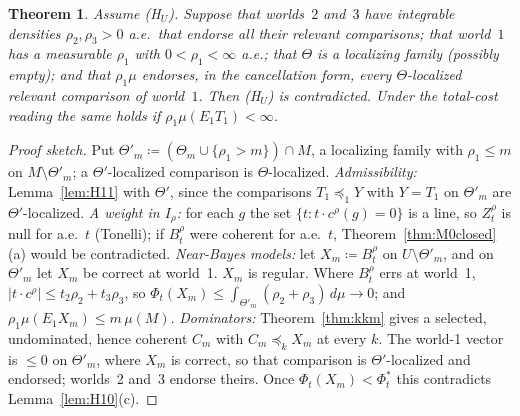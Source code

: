 \documentclass[11pt]{article}
\newtheorem{theorem}{Theorem}[section]
\theoremstyle{definition}
\theoremstyle{remark}
\begin{document}
\begin{theorem}\label{thm:H12}
Assume (H$_U$). Suppose that worlds~$2$ and~$3$ have integrable densities $\rho_2,\rho_3>0$ a.e.\ that endorse all their relevant comparisons; that world~$1$ has a measurable $\rho_1$ with $0<\rho_1<\infty$ a.e.; that $\Theta$ is a localizing family (possibly empty); and that $\rho_1\mu$ endorses, in the cancellation form, every $\Theta$-localized relevant comparison of world~$1$. Then (H$_U$) is contradicted. Under the total-cost reading the same holds if $\rho_1\mu(E_1T_1)<\infty$.
\end{theorem}
\begin{proof}[Proof sketch]
Put $\Theta'_m\coloneqq(\Theta_m\cup\{\rho_1>m\})\cap M$, a localizing family with $\rho_1\le m$ on $M\setminus\Theta'_m$; a $\Theta'$-localized comparison is $\Theta$-localized. \emph{Admissibility:} Lemma~\ref{lem:H11} with $\Theta'$, since the comparisons $T_1\preceq_1Y$ with $Y=T_1$ on $\Theta'_m$ are $\Theta'$-localized. \emph{A weight in $I_\rho$:} for each $g$ the set $\{t:t\cdot c^\rho(g)=0\}$ is a line, so $Z^\rho_t$ is null for a.e.\ $t$ (Tonelli); if $B^\rho_t$ were coherent for a.e.\ $t$, Theorem~\ref{thm:M0closed}(a) would be contradicted. \emph{Near-Bayes models:} let $X_m\coloneqq B^\rho_t$ on $U\setminus\Theta'_m$, and on $\Theta'_m$ let $X_m$ be correct at world~1. $X_m$ is regular. Where $B^\rho_t$ errs at world~1, $|t\cdot c^\rho|\le t_2\rho_2+t_3\rho_3$, so $\Phi_t(X_m)\le\int_{\Theta'_m}(\rho_2+\rho_3)\,d\mu\to0$; and $\rho_1\mu(E_1X_m)\le m\,\mu(M)$. \emph{Dominators:} Theorem~\ref{thm:kkm} gives a selected, undominated, hence coherent $C_m$ with $C_m\preceq_kX_m$ at every $k$. The world-1 vector is $\le0$ on $\Theta'_m$, where $X_m$ is correct, so that comparison is $\Theta'$-localized and endorsed; worlds~2 and~3 endorse theirs. Once $\Phi_t(X_m)<\Phi^*_t$ this contradicts Lemma~\ref{lem:H10}(c).
\end{proof}
\end{document}
